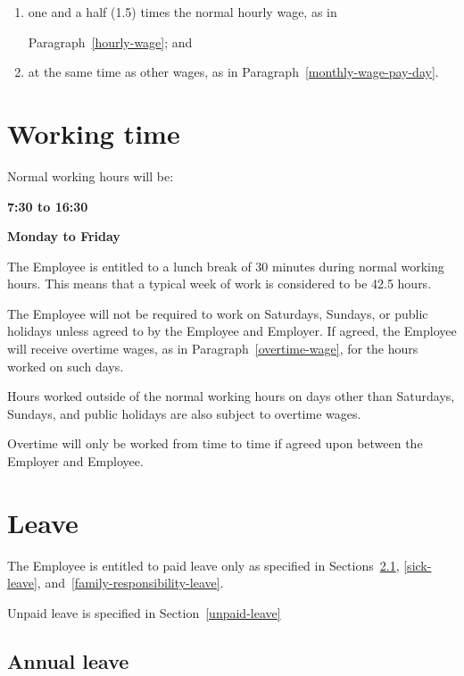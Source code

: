 \documentclass[a4paper,11pt]{article}
\begin{document}
\begin{enumerate}

  \item one and a half (1.5) times the normal hourly wage, as in\par
    Paragraph~\ref{hourly-wage}; and

  \item at the same time as other wages, as in
    Paragraph~\ref{monthly-wage-pay-day}.

\end{enumerate}

\section{Working time}
\label{working-time}

\para Normal working hours will be:

\begin{center}
   \textbf{7:30 to 16:30}

   \textbf{Monday to Friday}
\end{center}

\para The Employee is entitled to a lunch break of 30 minutes during normal
working hours. This means that a typical week of work is considered to be 42.5
hours.

\para The Employee will not be required to work on Saturdays, Sundays, or
public holidays unless agreed to by the Employee and Employer. If agreed, the
Employee will receive overtime wages, as in Paragraph~\ref{overtime-wage}, for
the hours worked on such days.

\para Hours worked outside of the normal working hours on days other than
Saturdays, Sundays, and public holidays are also subject to overtime wages.

\para Overtime will only be worked from time to time if agreed upon between the
Employer and Employee.

\section{Leave}
\label{leave}

\para The Employee is entitled to paid leave only as specified in
Sections~\ref{annual-leave}, \ref{sick-leave},
and~\ref{family-responsibility-leave}.

\para Unpaid leave is specified in Section~\ref{unpaid-leave}

\subsection{Annual leave}
\label{annual-leave}
\end{document}

